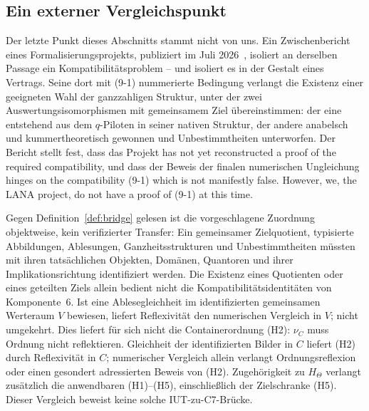 \documentclass[11pt,a4paper]{article}
\begin{document}
\subsection{Ein externer Vergleichspunkt}\label{sec:abc-external}

Der letzte Punkt dieses Abschnitts stammt nicht von uns. Ein Zwischenbericht
eines Formalisierungsprojekts, publiziert im Juli 2026~\cite{LANA2026},
isoliert an derselben Passage ein Kompatibilitätsproblem -- und isoliert es
in der Gestalt eines Vertrags. Seine dort mit (9-1) nummerierte Bedingung
verlangt die Existenz einer geeigneten Wahl der ganzzahligen Struktur, unter
der zwei Auswertungsisomorphismen mit gemeinsamem Ziel übereinstimmen: der
eine entstehend aus dem $q$-Piloten in seiner nativen Struktur, der andere
anabelsch und kummertheoretisch gewonnen und Unbestimmtheiten unterworfen.
Der Bericht stellt fest, dass das Projekt \glqq has not yet reconstructed a proof
of the required compatibility\grqq{}, und dass der Beweis der finalen numerischen
Ungleichung \glqq hinges on the compatibility (9-1) which is not manifestly
false. However, we, the LANA project, do not have a proof of (9-1) at this
time.\grqq{}

Gegen Definition~\ref{def:bridge} gelesen ist die vorgeschlagene Zuordnung
objektweise, kein verifizierter Transfer: Ein gemeinsamer Zielquotient,
typisierte Abbildungen, Ablesungen, Ganzheitsstrukturen und Unbestimmtheiten
müssten mit ihren tatsächlichen Objekten, Domänen, Quantoren und ihrer
Implikationsrichtung identifiziert werden. Die Existenz eines Quotienten oder
eines geteilten Ziels allein bedient nicht die Kompatibilitätsidentitäten
von Komponente~6. Ist eine Ablesegleichheit im identifizierten
gemeinsamen Werteraum $V$ bewiesen, liefert Reflexivität den numerischen
Vergleich in $V$; nicht umgekehrt. Dies liefert für sich nicht die
Containerordnung (H2): $\nu_C$ muss Ordnung nicht reflektieren. Gleichheit
der identifizierten Bilder in $C$ liefert (H2) durch Reflexivität in $C$;
numerischer Vergleich allein verlangt Ordnungsreflexion oder einen gesondert
adressierten Beweis von (H2). Zugehörigkeit zu
$H_\Theta$ verlangt zusätzlich die anwendbaren (H1)--(H5), einschließlich
der Zielschranke (H5). Dieser Vergleich beweist keine solche IUT-zu-C7-Brücke.
\end{document}
